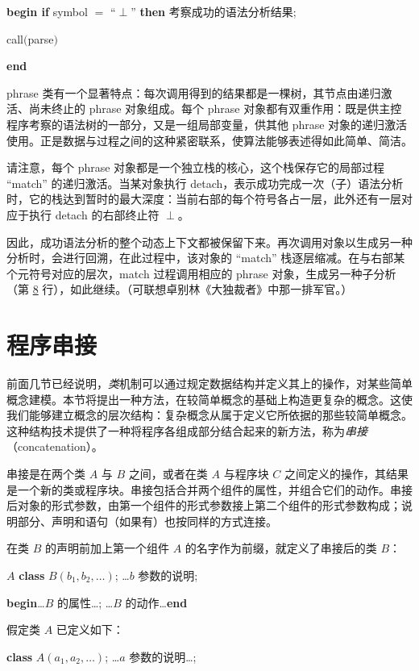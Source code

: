 \quad \textbf{begin if} symbol $=$ ``$\perp$'' \textbf{then} 考察成功的语法分析结果;

\quad \quad call$($parse$)$

\quad \textbf{end}

phrase 类有一个显著特点：每次调用得到的结果都是一棵树，其节点由递归激活、尚未终止的 phrase 对象组成。每个 phrase 对象都有双重作用：既是供主控程序考察的语法树的一部分，又是一组局部变量，供其他 phrase 对象的递归激活使用。正是数据与过程之间的这种紧密联系，使算法能够表述得如此简单、简洁。

请注意，每个 phrase 对象都是一个独立栈的核心，这个栈保存它的局部过程 ``match'' 的递归激活。当某对象执行 detach，表示成功完成一次（子）语法分析时，它的栈达到暂时的最大深度：当前右部的每个符号各占一层，此外还有一层对应于执行 detach 的右部终止符 $\perp$。

因此，成功语法分析的整个动态上下文都被保留下来。再次调用对象以生成另一种分析时，会进行回溯，在此过程中，该对象的 ``match'' 栈逐层缩减。在与右部某个元符号对应的层次，match 过程调用相应的 phrase 对象，生成另一种子分析（第 \hyperref[en:comment-label-8]{8} 行），如此继续。（可联想卓别林《大独裁者》中那一排军官。）

\section{程序串接}

前面几节已经说明，\textit{类}机制可以通过规定数据结构并定义其上的操作，对某些简单概念建模。本节将提出一种方法，在较简单概念的基础上构造更复杂的概念。这使我们能够建立概念的层次结构：复杂概念从属于定义它所依据的那些较简单概念。这种结构技术提供了一种将程序各组成部分结合起来的新方法，称为\textit{串接}（concatenation）。

串接是在两个类 $A$ 与 $B$ 之间，或者在类 $A$ 与程序块 $C$ 之间定义的操作，其结果是一个新的类或程序块。串接包括合并两个组件的属性，并组合它们的动作。串接后对象的形式参数，由第一个组件的形式参数接上第二个组件的形式参数构成；说明部分、声明和语句（如果有）也按同样的方式连接。

在类 $B$ 的声明前加上第一个组件 $A$ 的名字作为前缀，就定义了串接后的类 $B$：

\quad $A$ \textbf{class} $B(b_1, b_2, \dots)$; \dots $b$ 参数的说明;

\quad\quad \textbf{begin}\dots $B$ 的属性\dots; \dots $B$ 的动作\dots \textbf{end}

\noindent
假定类 $A$ 已定义如下：

\quad \textbf{class} $A(a_1, a_2 , \dots)$; \dots $a$ 参数的说明\dots;

